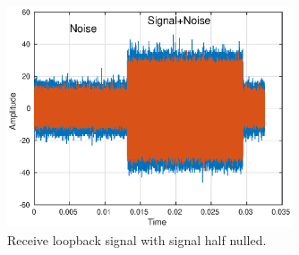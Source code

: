 \documentclass[letterpaper,12pt]{article}
\begin{document}
\begin{figure}[htp!]
\centering
\includegraphics[width=0.75\textwidth]{snr_compare.eps}
\caption{Receive loopback signal with signal half nulled.}\label{fig:snr_test}
\end{figure}
\end{document}
